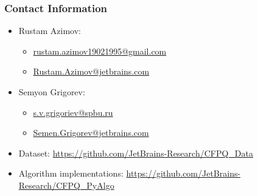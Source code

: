 \documentclass[xcolor=table,aspectratio=169]{beamer}
\begin{document}
\begin{frame}
\frametitle{Contact Information}
\begin{itemize}
  \item Rustam Azimov:
  \begin{itemize}
  	\item \href{mailto:rustam.azimov19021995@gmail.com}{rustam.azimov19021995@gmail.com}
  	\item \href{mailto:Rustam.Azimov@jetbrains.com}{Rustam.Azimov@jetbrains.com}
  \end{itemize}
\item Semyon Grigorev:
\begin{itemize}
	\item \href{mailto:s.v.grigoriev@spbu.ru}{s.v.grigoriev@spbu.ru}
	\item \href{mailto:Semen.Grigorev@jetbrains.com}{Semen.Grigorev@jetbrains.com}
\end{itemize}
\vspace{0.5cm}
  \item Dataset: \href{https://github.com/JetBrains-Research/CFPQ_Data}{https://github.com/JetBrains-Research/CFPQ\_Data}
   \item Algorithm implementations: \href{https://github.com/JetBrains-Research/CFPQ_PyAlgo}{https://github.com/JetBrains-Research/CFPQ\_PyAlgo}
\end{itemize}
\vspace{0.1cm}
\end{frame}
\end{document}
